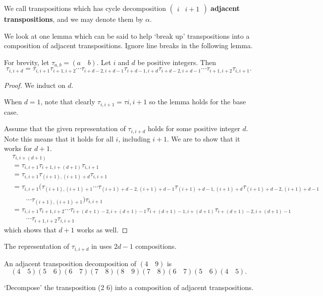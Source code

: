 We call transpositions which has cycle decomposition $\begin{pmatrix}i&i+1\end{pmatrix}$ \textbf{adjacent transpositions}, and we may denote them by $\alpha$.

We look at one lemma which can be said to help `break up' transpositions into a composition of adjacent transpositions. Ignore line breaks in the following lemma.

\begin{lemma}\label{lemma-decompose-transposition}
    For brevity, let $\tau_{a,b} = (a\quad b)$. Let $i$ and $d$ be positive integers. Then
    \[
        \tau_{i,i+d} = \tau_{i,i+1}\tau_{i+1,i+2}\cdots\tau_{i+d-2,i+d-1}\tau_{i+d-1,i+d}\tau_{i+d-2,i+d-1}\cdots\tau_{i+1,i+2}\tau_{i,i+1}.
    \]
\end{lemma}

\begin{proof}
    We induct on $d$.

    When $d = 1$, note that clearly $\tau_{i,i+1} = \tau{i,i+1}$ so the lemma holds for the base case.

    Assume that the given representation of $\tau_{i,i+d}$ holds for some positive integer $d$. Note this means that it holds for all $i$, including $i+1$. We are to show that it works for $d + 1$.
    \begin{align*}
        &\tau_{i, i+(d+1)}\\
        &= \tau_{i,i+1}\tau_{i+1,i+(d+1)}\tau_{i,i+1}\\
        &= \tau_{i,i+1}\tau_{(i+1),(i+1)+d}\tau_{i,i+1}\\
        &= \tau_{i,i+1}(\tau_{(i+1),(i+1)+1}\cdots\tau_{(i+1)+d-2,(i+1)+d-1}\tau_{(i+1)+d-1,(i+1)+d}\tau_{(i+1)+d-2,(i+1)+d-1}\\
        &\quad\quad\cdots\tau_{(i+1),(i+1)+1})\tau_{i,i+1}\\
        &= \tau_{i,i+1}\tau_{i+1,i+2}\cdots\tau_{i+(d+1)-2,i+(d+1)-1}\tau_{i+(d+1)-1,i+(d+1)}\tau_{i+(d+1)-2,i+(d+1)-1}\\
        &\quad\quad\cdots\tau_{i+1,i+2}\tau_{i,i+1}
    \end{align*}
    which shows that $d+1$ works as well.
\end{proof}
\begin{remark}
    The representation of $\tau_{i,i+d}$ in  uses $2d-1$ compositions.
\end{remark}
\begin{example}
    An adjacent transposition decomposition of $(4\quad9)$ is
    \[
        (4\quad 5)(5\quad 6)(6\quad 7)(7\quad 8)(8\quad 9)(7\quad 8)(6\quad 7)(5\quad 6)(4\quad 5).
    \]
\end{example}
\begin{exercise}
    `Decompose' the transposition (2 6) into a composition of adjacent transpositions.
\end{exercise}

